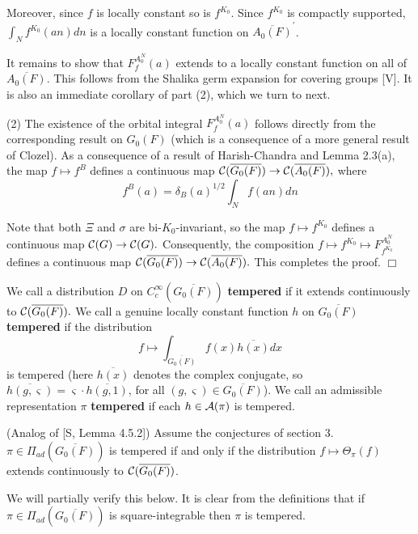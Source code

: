 Moreover, since $f$ is locally constant so is $f^{K_0}$. Since $f^{K_0}$ is
compactly supported, $\int_Nf^{K_0}(an)dn$ is a locally constant function on 
$\overline{A_0(F)}^{\prime }$.

It remains to show that $F_f^{A_0^N}(a)$ extends to a locally constant
function on all of $\overline{A_0(F)}$. This follows from the Shalika germ
expansion for covering groups [V]. It is also an immediate corollary of part
(2), which we turn to next.

(2) The existence of the orbital integral $F_f^{A_0^N}(a)$ follows directly
from the corresponding result on $G_0(F)$ (which is a consequence of a more
general result of Clozel). As a consequence of a result of Harish-Chandra
and Lemma 2.3(a), the map $f\longmapsto f^B$ defines a continuous map ${\cal %
C}(\overline{G_0(F)})\rightarrow {\cal C}(\overline{A_0(F)}),$ where 
\begin{equation}
f^B(a)=\delta _B(a)^{1/2}\int_Nf(an)dn
\end{equation}

Note that both $\Xi $ and $\sigma $ are bi-$K_0$-invariant, so the map $%
f\longmapsto f^{K_0}$ defines a continuous map ${\cal C}(G)\rightarrow {\cal %
C}(G).$ Consequently, the composition $f\longmapsto f^{K_0}\longmapsto
F_{f^{K_0}}^{A_0^N}$ defines a continuous map ${\cal C}(\overline{G_0(F)}%
)\rightarrow {\cal C}(\overline{A_0(F)}).$ This completes the proof. $\Box $

We call a distribution $D$ on $C_c^\infty (\overline{G_0(F)})$ {\bf tempered}
if it extends continuously to ${\cal C}(\overline{G_0(F)}).$ We call a
genuine locally constant function $h$ on $\overline{G_0(F)}$ {\bf tempered}
if the distribution 
\[
f\longmapsto \int_{\overline{G_0(F)}}f(x)\overline{h(x)}dx 
\]
is tempered (here $\overline{h(x)}$ denotes the complex conjugate, so $%
\overline{h(g,\varsigma )}=\varsigma \cdot \overline{h(g,1)}$, for all $%
(g,\varsigma )\in \overline{G_0(F)}$). We call an admissible representation $%
\pi $ {\bf tempered} if each $h\in {\cal A}(\pi )$ is tempered.

\begin{lemma}
(Analog of [S, Lemma 4.5.2]) Assume the conjectures of section 3. $\pi \in
\Pi _{ad}(\overline{G_0(F)})$ is tempered if and only if the distribution $%
f\longmapsto \Theta _\pi (f)$ extends continuously to ${\cal C}(\overline{%
G_0(F)})$.
\end{lemma}

We will partially verify this below. It is clear from the definitions that
if $\pi \in \Pi _{ad}(\overline{G_0(F)})$ is square-integrable then $\pi $
is tempered.

